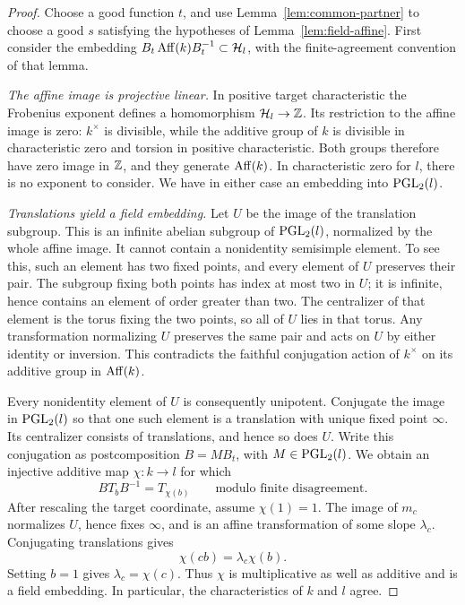 \begin{proof}
Choose a good function \(t\), and use Lemma~\ref{lem:common-partner} to
choose a good \(s\) satisfying the hypotheses of
Lemma~\ref{lem:field-affine}.  First consider the embedding
\(B_t\operatorname{Aff}(k)B_t^{-1}\subset\mathcal H_l\), with the finite-agreement
convention of that lemma.

\emph{The affine image is projective linear.}
In positive target characteristic the Frobenius exponent defines a
homomorphism \(\mathcal H_l\to\mathbb Z\).  Its restriction to the affine image is
zero: \(k^\times\) is divisible, while the additive group of \(k\) is
divisible in characteristic zero and torsion in positive characteristic.
Both groups therefore have zero image in \(\mathbb Z\), and they generate
\(\operatorname{Aff}(k)\).  In characteristic zero for \(l\), there is no exponent to
consider.  We have in either case an embedding into \(\operatorname{PGL}_2(l)\).

\emph{Translations yield a field embedding.}
Let \(U\) be the image of the translation subgroup.  This is an infinite
abelian subgroup of \(\operatorname{PGL}_2(l)\), normalized by the whole affine image.
It cannot contain a nonidentity semisimple element.  To see this, such an
element has two fixed points, and every element of \(U\) preserves their
pair.  The subgroup fixing both points has index at most two in \(U\);
it is infinite, hence contains an element of order greater than two.
The centralizer of that element is the torus fixing the two points, so
all of \(U\) lies in that torus.  Any transformation normalizing \(U\)
preserves the same pair and acts on \(U\) by either identity or inversion.
This contradicts the faithful conjugation action of \(k^\times\) on its
additive group in \(\operatorname{Aff}(k)\).

Every nonidentity element of \(U\) is consequently unipotent.  Conjugate
the image in \(\operatorname{PGL}_2(l)\) so that one such element is a translation with
unique fixed point \(\infty\).  Its centralizer consists of translations,
and hence so does \(U\).  Write this conjugation as postcomposition
\(B=MB_t\), with \(M\in\operatorname{PGL}_2(l)\).  We obtain an injective additive map
\(\chi:k\to l\) for which
\begin{equation}\label{eq:field-translation}
 BT_bB^{-1}=T_{\chi(b)}
 \qquad\text{modulo finite disagreement}.
\end{equation}
After rescaling the target coordinate, assume \(\chi(1)=1\).
The image of \(m_c\) normalizes \(U\), hence fixes \(\infty\), and is an
affine transformation of some slope \(\lambda_c\).
Conjugating translations gives
\[
 \chi(cb)=\lambda_c\chi(b).
\]
Setting \(b=1\) gives \(\lambda_c=\chi(c)\).  Thus \(\chi\) is
multiplicative as well as additive and is a field embedding.  In
particular, the characteristics of \(k\) and \(l\) agree.


\end{proof}
